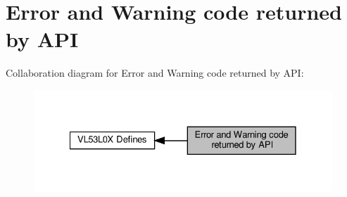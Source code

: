 \hypertarget{group__VL53L0X__define__Error__group}{}\section{Error and Warning code returned by A\+PI}
\label{group__VL53L0X__define__Error__group}
Collaboration diagram for Error and Warning code returned by A\+PI\+:\nopagebreak
\begin{figure}[H]
\begin{center}
\leavevmode
\includegraphics[width=328pt]{group__VL53L0X__define__Error__group}
\end{center}
\end{figure}
